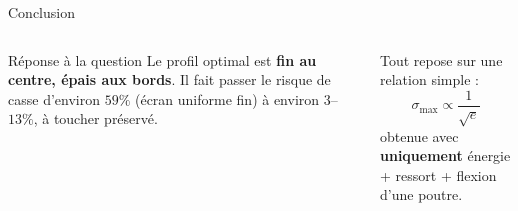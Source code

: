 \documentclass[11pt,aspectratio=169]{beamer}
\begin{document}
\begin{frame}{Conclusion}
  \begin{columns}[c]
    \begin{block}{Réponse à la question}
    \footnotesize Le profil optimal est \textbf{fin au centre, épais aux
    bords}. Il fait passer le risque de casse d'environ
    \textcolor{danger}{$59\%$} (écran uniforme fin) à environ
    \textcolor{ok}{$3$--$13\%$}, à toucher préservé.
    \end{block}
    \footnotesize Tout repose sur une relation simple :
    \[ \sigma_{\max}\propto \frac{1}{\sqrt{e}} \]
    obtenue avec \textbf{uniquement} énergie + ressort + flexion d'une poutre.
    \centering
  \end{columns}
\end{frame}
\end{document}
